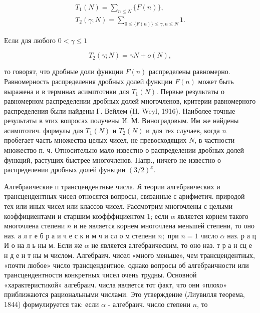 \documentclass[10pt]{article}
\begin{document}
\[

\begin{gathered}

T_{1}(N)=\sum_{n \leqslant N}\{F(n)\}, \\

T_{2}(\gamma ; N)=\sum_{0 \leqslant\{F(n)\} \leqslant \gamma, n \leqslant N} 1 .

\end{gathered}

\]



Если для любого $0<\gamma \leqslant 1$



\[

T_{2}(\gamma ; N)=\gamma N+o(N),

\]



то говорят, что дробные доли функции $F(n)$ распределены равномерно. Равномерность распределения дробных долей функции $F(n)$ может быть выражена и в терминах асимптотики для $T_{1}(N)$. Первые результаты о равномерном распределении дробных долей многочленов, критерии равномерного распределения были найдены Г. Вейлем (H. Weyl, 1916). Наиболее точные результаты в этих вопросах получены И. М. Виноградовым. Им же найдены асимптотич. формулы для $T_{1}(N)$ и $T_{2}(N)$ и для тех случаев, когда $n$ пробегает часть множества целых чисел, не превосходящих $N$, в частности множество п. ч. Относительно мало известно о распределении дробных долей функций, растущих быстрее многочленов. Напр., ничего не известно о распределении дробных долей функции $(3 / 2)^{x}$.



Алгебраические п трансцендентные числа. $\mathfrak{K}$ теории алгебраических и трансцендентных чисел относятся вопросы, связанные с арифметич. природой тех или иных чисел или классов чисел. Рассмотрим многочлены с целыми коэффициентами и старшим коэфффициентом 1; если $\alpha$ является корнем такого многочлена степени $n$ и не является корнем многочлена меньшей степени, то оно наз. а л г е б р а и ч е с к и м ч и сл о м степени $n ;$ при $n=1$ число $\alpha$ наз. р а ц И о на л ь ны м. Если же $\alpha$ не является алгебраическим, то оно наз. т р а н сц е н д е н т ны м числом. Алгебраич. чисел «много меньше», чем трансцендентных, «почти любое» число трансцендентное, однако вопросы об алгебраичности или трансцендентности конкретных чисел очень трудны. Основной «характеристикой» алгебраич. числа является тот факт, что они «плохо» приближаются рациональными числами. Это утверждение (Лиувилля теорема, 1844) формулируется так: если $\alpha$ - алгебраич. число степени $n$, то
\end{document}

